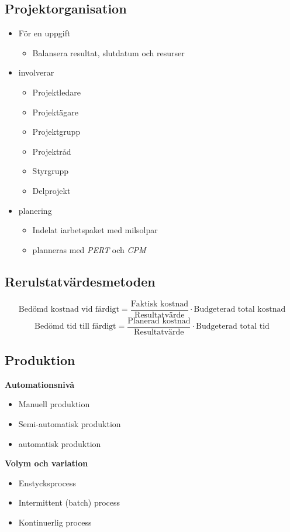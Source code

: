 \subsection{Projektorganisation}
\begin{itemize}
    \item För en uppgift
    \begin{itemize}
        \item Balansera resultat, slutdatum och resurser
    \end{itemize}
    \item involverar
    \begin{itemize}
        \item Projektledare
        \item Projektägare
        \item Projektgrupp
        \item Projektråd 
        \item Styrgrupp
        \item Delprojekt
    \end{itemize}
    \item planering
    \begin{itemize}
        \item Indelat iarbetspaket med milsolpar 
        \item planneras med \textit{PERT} och \textit{CPM} %
    \end{itemize}
\end{itemize}

\subsection{Rerulstatvärdesmetoden}
\begin{equation*}
    \text{Bedömd kostnad vid färdigt} = \frac{\text{Faktisk kostnad}}{\text{Resultatvärde}} 
    \cdot \text{Budgeterad total kostnad}
\end{equation*}
\begin{equation*}
    \text{Bedömd tid till färdigt} = \frac{\text{Planerad kostnad}}{\text{Resultatvärde}} 
    \cdot \text{Budgeterad total tid}
\end{equation*}

\subsection{Produktion}
\textbf{Automationsnivå}
\begin{itemize}
    \item Manuell produktion
    \item Semi-automatisk produktion
    \item automatisk produktion
\end{itemize}
\textbf{Volym och variation}
\begin{itemize}
    \item Enstycksprocess
    \item Intermittent (batch) process 
    \item Kontinuerlig process
\end{itemize}

